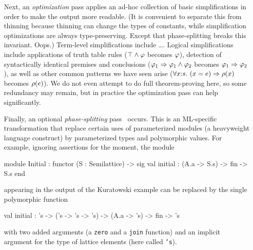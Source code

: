 Next, an \emph{optimization} pass applies an ad-hoc collection of basic simplifications in order to make the output more readable.  (It is convenient to separate this from thinning because thinning can change the types of constants, while simplification optimizations are always type-preserving.  Except that phase-splitting breaks this invariant.  Oops.)  Term-level simplifications include \ldots.
Logical simplifications include applications of truth table rules ($\top\land \varphi$ becomes $\varphi$), detection of syntactically identical premises and conclusions ($\varphi_1\Rightarrow \varphi_1\land \varphi_2$ becomes $\varphi_1\Rightarrow \varphi_2$), as well as other common patterns we have seen arise
($\forall x{:}s.\ (x = e)\Rightarrow \rho(x)$ becomes $\rho(e)$).  We do not even attempt to do full theorem-proving here, so some redundancy may remain, but in practice the optimization pass can help significantly.

Finally, an optional \emph{phase-splitting} pass~\cite{harper+:popl90} occurs.  This is an ML-specific transformation that replace certain uses of parameterized modules (a heavyweight language construct) by parameterized types and polymorphic values.  For example, ignoring assertions for the moment, the module
\begin{source}
module Initial : functor (S : Semilattice) ->
                    sig
                      val initial : (A.a -> S.s) -> fin -> S.s
                    end	
\end{source}   
appearing in the output of the Kuratowski example can be replaced by the single polymorphic function
\begin{source}
val initial : 's -> ('s -> 's -> 's) -> (A.a -> 's) -> fin -> 's	
\end{source}
with two added arguments (a \texttt{zero} and a \texttt{join} function) and an implicit argument for the type of lattice elements (here called \texttt{'s}).

\label{sec:typechecking}



